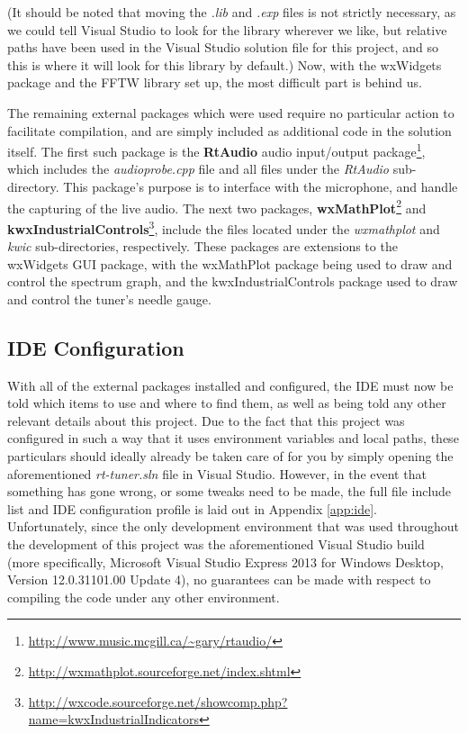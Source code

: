 \documentclass[12pt]{report}
\begin{document}
\indent (It should be noted that moving the \emph{.lib} and \emph{.exp} files is not strictly necessary, as we could tell Visual Studio to look for the library wherever we like, but relative paths have been used in the Visual Studio solution file for this project, and so this is where it will look for this library by default.) Now, with the wxWidgets package and the FFTW library set up, the most difficult part is behind us.

\indent The remaining external packages which were used require no particular action to facilitate compilation, and are simply included as additional code in the solution itself. The first such package is the {\bf RtAudio} audio input/output package\footnote{\url{http://www.music.mcgill.ca/~gary/rtaudio/}}, which includes the \emph{audioprobe.cpp} file and all files under the \emph{RtAudio} sub-directory. This package's purpose is to interface with the microphone, and handle the capturing of the live audio. The next two packages, {\bf wxMathPlot}\footnote{\url{http://wxmathplot.sourceforge.net/index.shtml}} and {\bf kwxIndustrialControls}\footnote{\url{http://wxcode.sourceforge.net/showcomp.php?name=kwxIndustrialIndicators}}, include the files located under the \emph{wxmathplot} and \emph{kwic} sub-directories, respectively. These packages are extensions to the wxWidgets GUI package, with the wxMathPlot package being used to draw and control the spectrum graph, and the kwxIndustrialControls package used to draw and control the tuner's needle gauge.

\subsection*{IDE Configuration}
\label{sec:ideconfig}
\indent With all of the external packages installed and configured, the IDE must now be told which items to use and where to find them, as well as being told any other relevant details about this project. Due to the fact that this project was configured in such a way that it uses environment variables and local paths, these particulars should ideally already be taken care of for you by simply opening the aforementioned \emph{rt-tuner.sln} file in Visual Studio. However, in the event that something has gone wrong, or some tweaks need to be made, the full file include list and IDE configuration profile is laid out in Appendix \ref{app:ide}. Unfortunately, since the only development environment that was used throughout the development of this project was the aforementioned Visual Studio build (more specifically, Microsoft Visual Studio Express 2013 for Windows Desktop, Version 12.0.31101.00 Update 4), no guarantees can be made with respect to compiling the code under any other environment.
\end{document}
